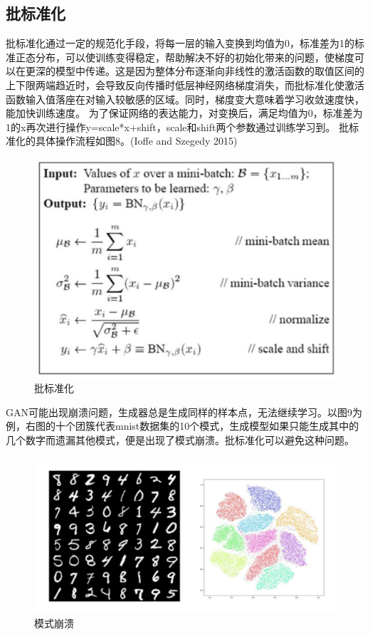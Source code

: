 \documentclass[
  hyperref, a4paper]{ctexart}
\begin{document}
\hypertarget{ux6279ux6807ux51c6ux5316}{%
\subsection{批标准化}\label{ux6279ux6807ux51c6ux5316}}

批标准化通过一定的规范化手段，将每一层的输入变换到均值为0，标准差为1的标准正态分布，可以使训练变得稳定，帮助解决不好的初始化带来的问题，使梯度可以在更深的模型中传递。这是因为整体分布逐渐向非线性的激活函数的取值区间的上下限两端趋近时，会导致反向传播时低层神经网络梯度消失，而批标准化使激活函数输入值落座在对输入较敏感的区域。同时，梯度变大意味着学习收敛速度快，能加快训练速度。
为了保证网络的表达能力，对变换后，满足均值为0，标准差为1的x再次进行操作y=scale*x+shift，scale和shift两个参数通过训练学习到。
批标准化的具体操作流程如图8。(Ioffe and Szegedy 2015)

\begin{figure}
\centering
\includegraphics{./8.png}
\caption{批标准化}
\end{figure}

GAN可能出现崩溃问题，生成器总是生成同样的样本点，无法继续学习。以图9为例，右图的十个团簇代表mnist数据集的10个模式，生成模型如果只能生成其中的几个数字而遗漏其他模式，便是出现了模式崩溃。批标准化可以避免这种问题。

\begin{figure}
\centering
\includegraphics{9.png}
\caption{模式崩溃}
\end{figure}
\end{document}
